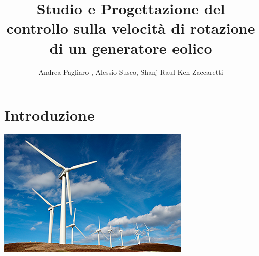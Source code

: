 \documentclass[a4paper,13pt]{article}
\begin{document}
\author{Andrea Pagliaro , Alessio Susco, Shanj Raul Ken Zaccaretti}
\title{Studio e Progettazione del controllo sulla velocità di rotazione di un generatore eolico}
\maketitle
\section{Introduzione}
\begin{center}
\includegraphics[scale=0.6]{graph/paleoliche.jpg}
\end{center}
\end{document}
